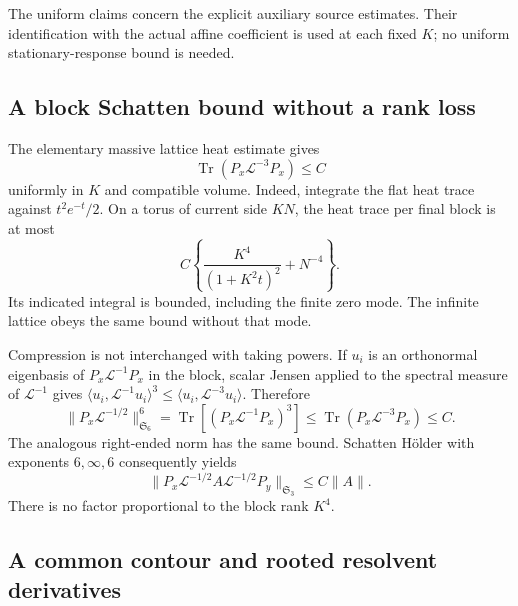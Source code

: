 The uniform claims concern the explicit auxiliary source estimates.
Their identification with the actual affine coefficient is used at
each fixed \(K\); no uniform stationary-response bound is needed.

\subsection{A block Schatten bound without a rank loss}
\label{sft-schatten-section}

The elementary massive lattice heat estimate gives
\begin{equation}
 \operatorname{Tr}(P_x\mathcal L^{-3}P_x)\le C
 \label{sft-third-moment}
\end{equation}
uniformly in \(K\) and compatible volume. Indeed, integrate the
flat heat trace against \(t^2e^{-t}/2\). On a torus of current side
\(KN\), the heat trace per final block is at most
\[
 C\left\{\frac{K^4}{(1+K^2t)^2}+N^{-4}\right\}.
\]
Its indicated integral is bounded, including the finite zero mode.
The infinite lattice obeys the same bound without that mode.

Compression is not interchanged with taking powers. If \(u_i\) is
an orthonormal eigenbasis of \(P_x\mathcal L^{-1}P_x\) in the block,
scalar Jensen applied to the spectral measure of \(\mathcal L^{-1}\)
gives
\(\langle u_i,\mathcal L^{-1}u_i\rangle^3
 \le\langle u_i,\mathcal L^{-3}u_i\rangle\).
Therefore
\begin{equation}
 \|P_x\mathcal L^{-1/2}\|_{\mathfrak S_6}^6
 =\operatorname{Tr}[(P_x\mathcal L^{-1}P_x)^3]
 \le\operatorname{Tr}(P_x\mathcal L^{-3}P_x)\le C.
 \label{sft-s6}
\end{equation}
The analogous right-ended norm has the same bound. Schatten
Hölder with exponents \(6,\infty,6\) consequently yields
\begin{equation}
 \|P_x\mathcal L^{-1/2}A\mathcal L^{-1/2}P_y\|_{\mathfrak S_3}
 \le C\|A\|.
 \label{sft-s3}
\end{equation}
There is no factor proportional to the block rank \(K^4\).

\subsection{A common contour and rooted resolvent derivatives}
\label{sft-resolvent-section}

